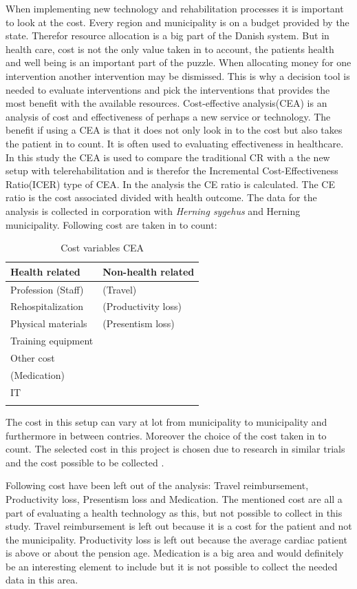 When implementing new technology and rehabilitation processes it is important to look at the cost. Every region and municipality is on a budget provided by the state. Therefor resource allocation is a big part of the Danish system. But in health care, cost is not the only value taken in to account, the patients health and well being is an important part of the puzzle. When allocating money for one intervention another intervention may be dismissed. This is why a decision tool is needed to evaluate interventions and pick the interventions that provides the most benefit with the available resources.
Cost-effective analysis(CEA) is an analysis of cost and effectiveness of perhaps a new service or technology. The benefit if using a CEA is that it does not only look in to the cost but also takes the patient in to count. It is often used to evaluating effectiveness in healthcare. In this study the CEA is used to compare the traditional CR with a the new setup with telerehabilitation and is therefor the Incremental Cost-Effectiveness Ratio(ICER) type of CEA. In the analysis the CE ratio is calculated. The CE ratio is the cost associated divided with health outcome.
The data for the analysis is collected in corporation with \textit{Herning sygehus} and Herning municipality. 
Following cost are taken in to count:


\begin{longtabu} to 
	\textbf{Health related} & \textbf{Non-health related}\\[-1ex]
	\midrule
	Profession (Staff) & (Travel) \\[-1ex]
	Rehospitalization & (Productivity loss) \\[-1ex]
	Physical materials & (Presentism loss)\\[-1ex]
	Training equipment &  \\[-1ex]
	Other cost &  \\[-1ex]
	(Medication) &  \\[-1ex]
	IT &  \\[-1ex]
	\hline
	\caption{Cost variables CEA}
\end{longtabu}

The cost in this setup can vary at lot from municipality to municipality and furthermore in between contries. Moreover the choice of the cost taken in to count. The selected cost in this project is chosen due to research in similar trials and the cost possible to be collected \cite{costeffect, usingeffect}. 


Following cost have been left out of the analysis: Travel reimbursement, Productivity loss, Presentism loss and Medication. The mentioned cost are all a part of evaluating a health technology as this, but not possible to collect in this study. Travel reimbursement is left out because it is a cost for the patient and not the municipality. Productivity loss is left out because the average cardiac patient is above or about the pension age. Medication is a big area and would definitely be an interesting element to include but it is not possible to collect the needed data in this area. 

